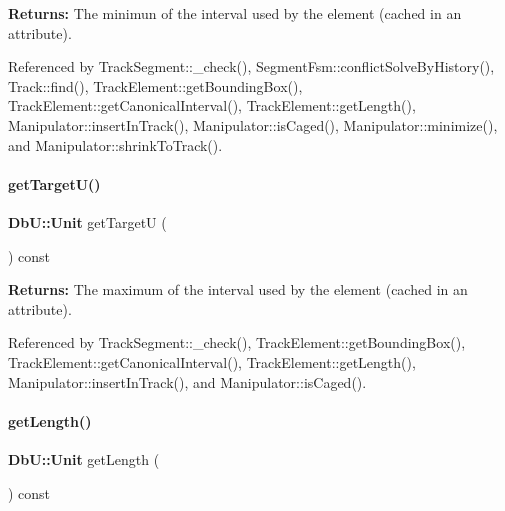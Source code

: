 {\bfseries Returns\+:} The minimun of the interval used by the element (cached in an attribute). 

Referenced by Track\+Segment\+::\+\_\+check(), Segment\+Fsm\+::conflict\+Solve\+By\+History(), Track\+::find(), Track\+Element\+::get\+Bounding\+Box(), Track\+Element\+::get\+Canonical\+Interval(), Track\+Element\+::get\+Length(), Manipulator\+::insert\+In\+Track(), Manipulator\+::is\+Caged(), Manipulator\+::minimize(), and Manipulator\+::shrink\+To\+Track().

\mbox{\label{classKite_1_1TrackElement_a4d52a506cd19dfa8e22e1dc0695bd960}} 
\paragraph{\texorpdfstring{get\+Target\+U()}{getTargetU()}}
{\footnotesize\ttfamily \textbf{ Db\+U\+::\+Unit} get\+TargetU (\begin{DoxyParamCaption}{ }\end{DoxyParamCaption}) const\hspace{0.3cm}{\ttfamily [inline]}}

{\bfseries Returns\+:} The maximum of the interval used by the element (cached in an attribute). 

Referenced by Track\+Segment\+::\+\_\+check(), Track\+Element\+::get\+Bounding\+Box(), Track\+Element\+::get\+Canonical\+Interval(), Track\+Element\+::get\+Length(), Manipulator\+::insert\+In\+Track(), and Manipulator\+::is\+Caged().

\mbox{\label{classKite_1_1TrackElement_ab1ca7adfc68761c749a16f65c9aa4088}} 
\paragraph{\texorpdfstring{get\+Length()}{getLength()}}
{\footnotesize\ttfamily \textbf{ Db\+U\+::\+Unit} get\+Length (\begin{DoxyParamCaption}{ }\end{DoxyParamCaption}) const\hspace{0.3cm}{\ttfamily [inline]}}

